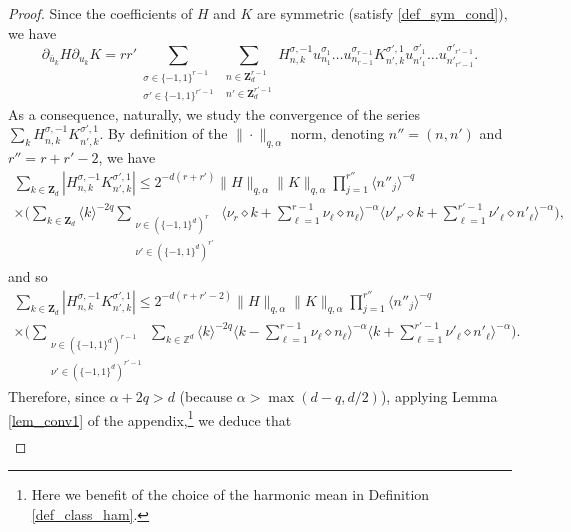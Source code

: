 \begin{proof}
Since the coefficients of $H$ and $K$ are symmetric (\ie satisfy \eqref{def_sym_cond}), we have
\begin{equation}
\label{eq_a_tue_un_chasseur}
\partial_{\bar{u}_k} H \partial_{u_k} K = r r' \sum_{\substack{\sigma \in \{-1,1\}^{r-1}\\ \sigma' \in \{-1,1\}^{r'-1} }} \sum_{\substack{n\in \mathbf{Z}_d^{r-1} \\ n'\in \mathbf{Z}_d^{r'-1} }} H_{n,k}^{\sigma,-1} u_{n_1}^{\sigma_1} \dots u_{n_{r-1}}^{\sigma_{r-1}} K_{n',k}^{\sigma',1} u_{n'_1}^{\sigma'_1} \dots u_{n'_{r'-1}}^{\sigma'_{r'-1}}.
\end{equation}
As a consequence, naturally, we study the convergence of the series $\sum_k H_{n,k}^{\sigma,-1} K_{n',k}^{\sigma',1}$. By definition of the $\| \cdot \|_{q,\alpha}$ norm, denoting $n''=(n,n')$ and $r''=r+r'-2$, we have
\begin{multline*}
\sum_{k\in \mathbf{Z}_d}|H_{n,k}^{\sigma,-1} K_{n',k}^{\sigma',1}| \leq 2^{-d(r+r')} \| H \|_{q,\alpha} \|K \|_{q,\alpha}\prod_{j=1}^{r''}\langle n''_j \rangle^{-q} \\
\times \biggl(\sum_{k\in \mathbf{Z}_d} \langle k \rangle^{-2q} \sum_{\substack{\nu \in (\{-1,1\}^d)^r \\ \nu' \in (\{-1,1\}^d)^{r'} } } \big\langle \nu_{r} \diamond k + \sum_{\ell =1}^{r-1} \nu_{\ell} \diamond n_{\ell} \big\rangle^{-\alpha} \big\langle \nu'_{r'} \diamond k + \sum_{\ell =1}^{r'-1} \nu'_{\ell} \diamond n'_{\ell} \big\rangle^{-\alpha} \biggr),
\end{multline*}
and so
\begin{multline*}
\sum_{k\in \mathbf{Z}_d}|H_{n,k}^{\sigma,-1} K_{n',k}^{\sigma',1}| \leq 2^{-d(r+r'-2)} \| H \|_{q,\alpha} \|K \|_{q,\alpha}\prod_{j=1}^{r''} \langle n''_j \rangle^{-q} \\
\times \biggl(\sum_{\substack{\nu \in (\{-1,1\}^d)^{r-1} \\ \nu' \in (\{-1,1\}^d)^{r'-1} } } \sum_{k\in \mathbb{Z}^d} \langle k \rangle^{-2q} \big\langle k - \sum_{\ell =1}^{r-1} \nu_{\ell} \diamond n_{\ell} \big\rangle^{-\alpha} \big\langle k + \sum_{\ell =1}^{r'-1} \nu'_{\ell} \diamond n'_{\ell} \big\rangle^{-\alpha} \biggr).
\end{multline*}
Therefore, since $\alpha+2q>d$ (because $\alpha>\max(d-q,d/2)$), applying Lemma \ref{lem_conv1} of the appendix,\footnote{Here we benefit of the choice of the harmonic mean in Definition \ref{def_class_ham}.} we deduce that
\begin{multline}
\label{eq_lugaru}

\end{multline}
\end{proof}
